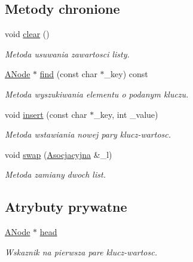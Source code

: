 \subsection*{Metody chronione}
\begin{DoxyCompactItemize}
\item 
void \hyperlink{struct_asocjacyjna_a9209f79af7b566f327c8c83f6b879f8b}{clear} ()
\begin{DoxyCompactList}\small\item\em Metoda usuwania zawartosci listy. \end{DoxyCompactList}\item 
\hyperlink{struct_a_node}{A\-Node} $\ast$ \hyperlink{struct_asocjacyjna_a6a9788d36521b4a89db3ab5a0110456f}{find} (const char $\ast$\-\_\-key) const 
\begin{DoxyCompactList}\small\item\em Metoda wyszukiwania elementu o podanym kluczu. \end{DoxyCompactList}\item 
void \hyperlink{struct_asocjacyjna_a0da4ccec0addd9aa1c4309e306994011}{insert} (const char $\ast$\-\_\-key, int \-\_\-value)
\begin{DoxyCompactList}\small\item\em Metoda wstawiania nowej pary klucz-\/wartosc. \end{DoxyCompactList}\item 
void \hyperlink{struct_asocjacyjna_ab6205ed432a156f99cd8b69f6931adb7}{swap} (\hyperlink{struct_asocjacyjna}{Asocjacyjna} \&\-\_\-l)
\begin{DoxyCompactList}\small\item\em Metoda zamiany dwoch list. \end{DoxyCompactList}\end{DoxyCompactItemize}
\subsection*{Atrybuty prywatne}
\begin{DoxyCompactItemize}
\item 
\hyperlink{struct_a_node}{A\-Node} $\ast$ \hyperlink{struct_asocjacyjna_adf1a2a6a5b0b6254122050bbe8c69046}{head}
\begin{DoxyCompactList}\small\item\em Wskaznik na pierwsza pare klucz-\/wartosc. \end{DoxyCompactList}\end{DoxyCompactItemize}
